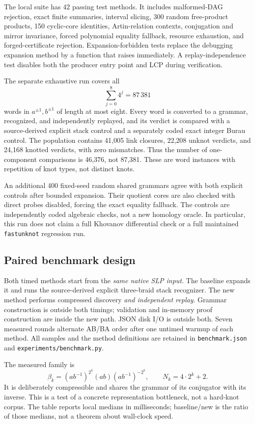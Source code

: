 \documentclass[11pt,letterpaper]{article}
\theoremstyle{definition}\newtheorem{definition}[theorem]{Definition}
\theoremstyle{remark}\newtheorem{remark}[theorem]{Remark}
\begin{document}
The local suite has 42 passing test methods. It includes malformed-DAG rejection, exact finite summaries, interval slicing, 300 random free-product products, 150 cyclic-core identities, Artin-relation contexts, conjugation and mirror invariance, forced polynomial equality fallback, resource exhaustion, and forged-certificate rejection. Expansion-forbidden tests replace the debugging expansion method by a function that raises immediately. A replay-independence test disables both the producer entry point and LCP during verification.

The separate exhaustive run covers all
\[
 \sum_{j=0}^{8}4^j=87\,381
\]
words in $a^{\pm1},b^{\pm1}$ of length at most eight. Every word is converted to a grammar, recognized, and independently replayed, and its verdict is compared with a source-derived explicit stack control and a separately coded exact integer Burau control. The population contains 41,005 link closures, 22,208 unknot verdicts, and 24,168 knotted verdicts, with zero mismatches. Thus the number of one-component comparisons is 46,376, not 87,381. These are word instances with repetition of knot types, not distinct knots.

An additional 400 fixed-seed random shared grammars agree with both explicit controls after bounded expansion. Their quotient cores are also checked with direct probes disabled, forcing the exact equality fallback. The controls are independently coded algebraic checks, not a new homology oracle. In particular, this run does not claim a full Khovanov differential check or a full maintained \texttt{fastunknot} regression run.

\subsection{Paired benchmark design}
Both timed methods start from the \emph{same native SLP input}. The baseline expands it and runs the source-derived explicit three-braid stack recognizer. The new method performs compressed discovery \emph{and independent replay}. Grammar construction is outside both timings; validation and in-memory proof construction are inside the new path. JSON disk I/O is outside both. Seven measured rounds alternate AB/BA order after one untimed warmup of each method. All samples and the method definitions are retained in \texttt{benchmark.json} and \texttt{experiments/benchmark.py}.

The measured family is
\[
 \beta_k=(ab^{-1})^{2^k}(ab)(ab^{-1})^{-2^k},\qquad
 N_k=4\cdot2^k+2.
\]
It is deliberately compressible and shares the grammar of its conjugator with its inverse. This is a test of a concrete representation bottleneck, not a hard-knot corpus. The table reports local medians in milliseconds; baseline/new is the ratio of those medians, not a theorem about wall-clock speed.
\end{document}
